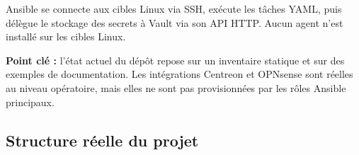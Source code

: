 \documentclass[11pt,a4paper]{article}
\newcommand{\iconInfo}{\textcolor{AccentBlue}{\faInfoCircle}}
\begin{document}
Ansible se connecte aux cibles Linux via SSH, exécute les tâches YAML, puis délègue le stockage des secrets à Vault via son API HTTP. Aucun agent n'est installé sur les cibles Linux.

\begin{tcolorbox}[
  enhanced,
  colback=PrimaryBlueLight,
  colframe=AccentBlue,
  boxrule=0pt,
  borderline west={3pt}{0pt}{AccentBlue},
  arc=0pt,
  left=10pt,right=10pt,top=7pt,bottom=7pt
]
\iconInfo\hspace{0.4em}\textbf{Point clé :} l'état actuel du dépôt repose sur un inventaire statique et sur des exemples de documentation. Les intégrations Centreon et OPNsense sont réelles au niveau opératoire, mais elles ne sont pas provisionnées par les rôles Ansible principaux.
\end{tcolorbox}

\subsection{Structure réelle du projet}
\end{document}
